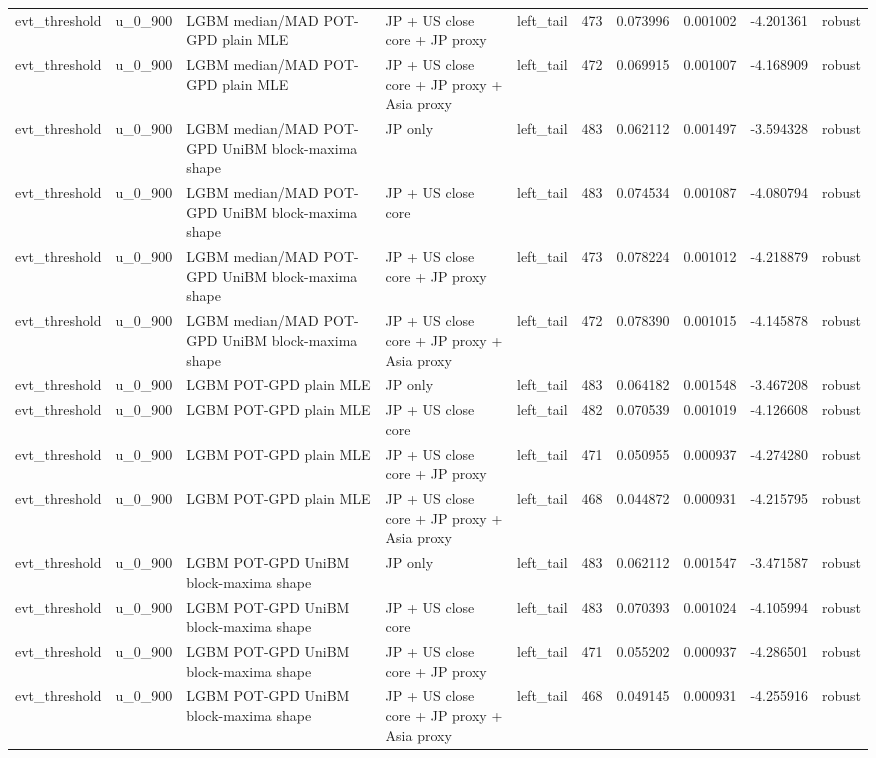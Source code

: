 \begin{tabular}{lll l lrrrrl}
evt\_threshold & u\_0\_900 & LGBM median/MAD POT-GPD plain MLE & JP + US close core + JP proxy & left\_tail & 473 & 0.073996 & 0.001002 & -4.201361 & robust \\
evt\_threshold & u\_0\_900 & LGBM median/MAD POT-GPD plain MLE & JP + US close core + JP proxy + Asia proxy & left\_tail & 472 & 0.069915 & 0.001007 & -4.168909 & robust \\
evt\_threshold & u\_0\_900 & LGBM median/MAD POT-GPD UniBM block-maxima shape & JP only & left\_tail & 483 & 0.062112 & 0.001497 & -3.594328 & robust \\
evt\_threshold & u\_0\_900 & LGBM median/MAD POT-GPD UniBM block-maxima shape & JP + US close core & left\_tail & 483 & 0.074534 & 0.001087 & -4.080794 & robust \\
evt\_threshold & u\_0\_900 & LGBM median/MAD POT-GPD UniBM block-maxima shape & JP + US close core + JP proxy & left\_tail & 473 & 0.078224 & 0.001012 & -4.218879 & robust \\
evt\_threshold & u\_0\_900 & LGBM median/MAD POT-GPD UniBM block-maxima shape & JP + US close core + JP proxy + Asia proxy & left\_tail & 472 & 0.078390 & 0.001015 & -4.145878 & robust \\
evt\_threshold & u\_0\_900 & LGBM POT-GPD plain MLE & JP only & left\_tail & 483 & 0.064182 & 0.001548 & -3.467208 & robust \\
evt\_threshold & u\_0\_900 & LGBM POT-GPD plain MLE & JP + US close core & left\_tail & 482 & 0.070539 & 0.001019 & -4.126608 & robust \\
evt\_threshold & u\_0\_900 & LGBM POT-GPD plain MLE & JP + US close core + JP proxy & left\_tail & 471 & 0.050955 & 0.000937 & -4.274280 & robust \\
evt\_threshold & u\_0\_900 & LGBM POT-GPD plain MLE & JP + US close core + JP proxy + Asia proxy & left\_tail & 468 & 0.044872 & 0.000931 & -4.215795 & robust \\
evt\_threshold & u\_0\_900 & LGBM POT-GPD UniBM block-maxima shape & JP only & left\_tail & 483 & 0.062112 & 0.001547 & -3.471587 & robust \\
evt\_threshold & u\_0\_900 & LGBM POT-GPD UniBM block-maxima shape & JP + US close core & left\_tail & 483 & 0.070393 & 0.001024 & -4.105994 & robust \\
evt\_threshold & u\_0\_900 & LGBM POT-GPD UniBM block-maxima shape & JP + US close core + JP proxy & left\_tail & 471 & 0.055202 & 0.000937 & -4.286501 & robust \\
evt\_threshold & u\_0\_900 & LGBM POT-GPD UniBM block-maxima shape & JP + US close core + JP proxy + Asia proxy & left\_tail & 468 & 0.049145 & 0.000931 & -4.255916 & robust \\

\end{tabular}
